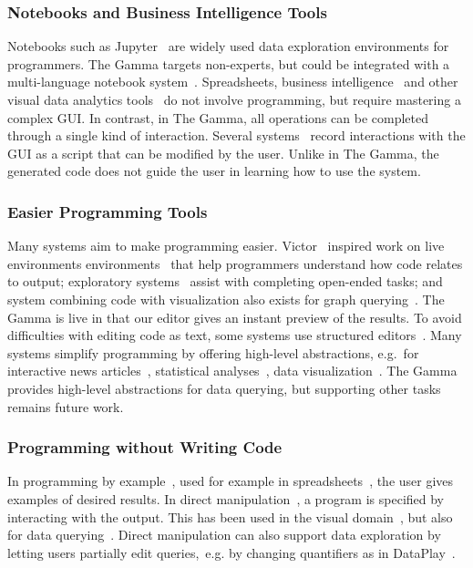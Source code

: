 \documentclass[conference]{IEEEtran}
\begin{document}
\vspace{0.5em}
\subsubsection*{Notebooks and Business Intelligence Tools}

Notebooks such as Jupyter~\cite{jupyter} are widely used data exploration environments for
programmers. The Gamma targets non-experts, but could be integrated with a multi-language
notebook system~\cite{wrattler}.
%
Spreadsheets, business intelligence~\cite{tableau,powerbi} and other visual data analytics
tools~\cite{control,vizdom} do not involve programming, but require mastering a complex GUI.
In contrast, in The Gamma, all operations can be completed through a single kind of interaction.
Several systems~\cite{potter,wrangler,lyra} record interactions with the GUI as a script that can
be modified by the user. Unlike in The Gamma, the generated code does not guide the user in
learning how to use the system.

\vspace{0.5em}
\subsubsection*{Easier Programming Tools}
Many systems aim to make programming easier. Victor~\cite{principle} inspired work on live
environments environments~\cite{review,liveroad,lighttable} that help programmers understand how
code relates to output; exploratory systems~\cite{variolite,exploratory} assist with completing
open-ended tasks; and system combining code with visualization also exists for graph
querying~\cite{guess}. The Gamma is live in that our editor gives an instant preview of the results.
To avoid difficulties with editing code as text, some systems use structured
editors~\cite{structure-based,livenut,lamdu,subtext,directprog}. Many systems simplify programming by
offering high-level abstractions, e.g.~for interactive news articles~\cite{idyll}, statistical
analyses~\cite{tea}, data visualization~\cite{interactionviz,vegalite}. The Gamma
provides high-level abstractions for data querying, but supporting other tasks remains future work.

\vspace{0.5em}
\subsubsection*{Programming without Writing Code}
In programming by example~\cite{byexample}, used for example in spreadsheets~\cite{spreadsheetpbe,flashextract},
the user gives examples of desired results. In direct manipulation~\cite{direct}, a program is
specified by interacting with the output. This has been used in the visual domain~\cite{sketchnsketch}, but also for data
querying~\cite{dynamicq,vlang,visage}. Direct manipulation can also support data exploration by letting
users partially edit queries,~e.g. by changing quantifiers as in DataPlay~\cite{dataplay}.
\end{document}
